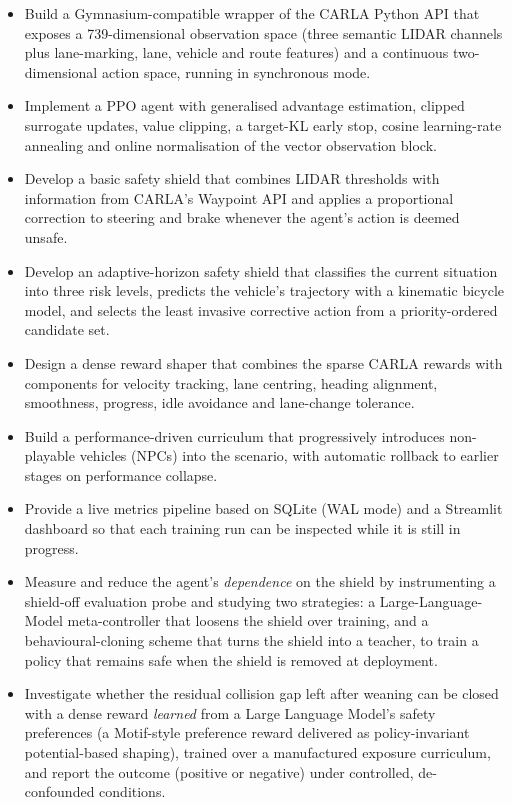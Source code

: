 \begin{itemize}
  \item[\textbf{SO1.}] Build a Gymnasium-compatible wrapper of the CARLA Python API that exposes a
        739-dimensional observation space (three semantic LIDAR channels plus lane-marking, lane,
        vehicle and route features) and a continuous two-dimensional action space, running in
        synchronous mode.
  \item[\textbf{SO2.}] Implement a PPO agent with generalised advantage estimation, clipped
        surrogate updates, value clipping, a target-KL early stop, cosine learning-rate annealing
        and online normalisation of the vector observation block.
  \item[\textbf{SO3.}] Develop a basic safety shield that combines LIDAR thresholds with
        information from CARLA's Waypoint API and applies a proportional correction to steering
        and brake whenever the agent's action is deemed unsafe.
  \item[\textbf{SO4.}] Develop an adaptive-horizon safety shield that classifies the current
        situation into three risk levels, predicts the vehicle's trajectory with a kinematic
        bicycle model, and selects the least invasive corrective action from a priority-ordered
        candidate set.
  \item[\textbf{SO5.}] Design a dense reward shaper that combines the sparse CARLA rewards with
        components for velocity tracking, lane centring, heading alignment, smoothness, progress,
        idle avoidance and lane-change tolerance.
  \item[\textbf{SO6.}] Build a performance-driven curriculum that progressively introduces
        non-playable vehicles (NPCs) into the scenario, with automatic rollback to earlier
        stages on performance collapse.
  \item[\textbf{SO7.}] Provide a live metrics pipeline based on SQLite (WAL mode) and a Streamlit
        dashboard so that each training run can be inspected while it is still in progress.
  \item[\textbf{SO8.}] Measure and reduce the agent's \emph{dependence} on the shield by
        instrumenting a shield-off evaluation probe and studying two strategies: a
        Large-Language-Model meta-controller that loosens the shield over training, and a
        behavioural-cloning scheme that turns the shield into a teacher, to train a policy that
        remains safe when the shield is removed at deployment.
  \item[\textbf{SO9.}] Investigate whether the residual collision gap left after weaning can be
        closed with a dense reward \emph{learned} from a Large Language Model's safety
        preferences (a Motif-style preference reward delivered as policy-invariant potential-based
        shaping), trained over a manufactured exposure curriculum, and report the outcome (positive
        or negative) under controlled, de-confounded conditions.
\end{itemize}

